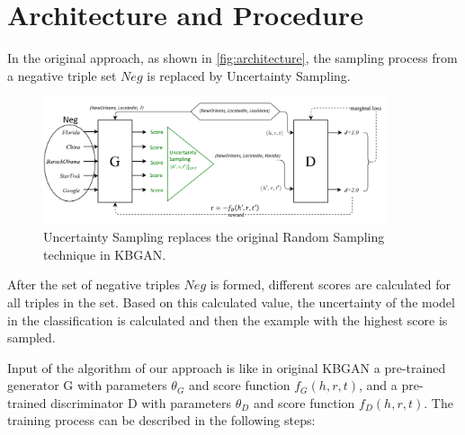 
\section{Architecture and Procedure} \label{sec:architecture_and_procedure}
In the original  approach, as shown in \autoref{fig:architecture}, the sampling process from a negative triple set $Neg$ is replaced by Uncertainty Sampling.
\begin{figure}[t]
  \centering
    \includegraphics[width=0.90\textwidth]{figures/architecture.png}
  \caption{Uncertainty Sampling replaces the original Random Sampling technique in \ac{KBGAN}.}
  \label{fig:architecture}
\end{figure}
After the set of negative triples $Neg$ is formed, different scores are calculated for all triples in the set.
Based on this calculated value, the uncertainty of the model in the classification is calculated and then the example with the highest score is sampled. 

Input of the algorithm of our approach is like in original \ac{KBGAN} a pre-trained generator G with parameters $\theta_G$ and score function $f_G(h,r,t)$, 
and a pre-trained discriminator D with parameters $\theta_D$ and score function $f_D(h,r,t)$.
The training process can be described in the following steps:

